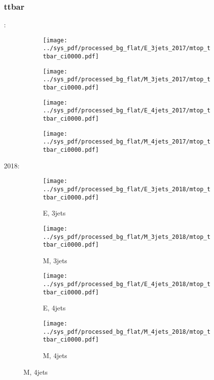 \documentclass{beamer}
\begin{document}
\begin{frame}
\frametitle{ttbar}
\fontsize{5}{1}:
\begin{figure}
\centering
\begin{subfigure}[b]{0.24\textwidth}
\texttt{[image: ../sys\_pdf/processed\_bg\_flat/E\_3jets\_2017/mtop\_ttbar\_ci0000.pdf]}
\end{subfigure}
\begin{subfigure}[b]{0.24\textwidth}
\texttt{[image: ../sys\_pdf/processed\_bg\_flat/M\_3jets\_2017/mtop\_ttbar\_ci0000.pdf]}
\end{subfigure}
\begin{subfigure}[b]{0.24\textwidth}
\texttt{[image: ../sys\_pdf/processed\_bg\_flat/E\_4jets\_2017/mtop\_ttbar\_ci0000.pdf]}
\end{subfigure}
\begin{subfigure}[b]{0.24\textwidth}
\texttt{[image: ../sys\_pdf/processed\_bg\_flat/M\_4jets\_2017/mtop\_ttbar\_ci0000.pdf]}
\end{subfigure}
\end{figure}
2018:
\begin{figure}
\centering
\begin{subfigure}[b]{0.24\textwidth}
\texttt{[image: ../sys\_pdf/processed\_bg\_flat/E\_3jets\_2018/mtop\_ttbar\_ci0000.pdf]}
\captionsetup{font=tiny}
\caption{E, 3jets}
\end{subfigure}
\begin{subfigure}[b]{0.24\textwidth}
\texttt{[image: ../sys\_pdf/processed\_bg\_flat/M\_3jets\_2018/mtop\_ttbar\_ci0000.pdf]}
\captionsetup{font=tiny}
\caption{M, 3jets}
\end{subfigure}
\begin{subfigure}[b]{0.24\textwidth}
\texttt{[image: ../sys\_pdf/processed\_bg\_flat/E\_4jets\_2018/mtop\_ttbar\_ci0000.pdf]}
\captionsetup{font=tiny}
\caption{E, 4jets}
\end{subfigure}
\begin{subfigure}[b]{0.24\textwidth}
\texttt{[image: ../sys\_pdf/processed\_bg\_flat/M\_4jets\_2018/mtop\_ttbar\_ci0000.pdf]}
\captionsetup{font=tiny}
\caption{M, 4jets}
\end{subfigure}
\end{figure}
\end{frame}
\end{document}
